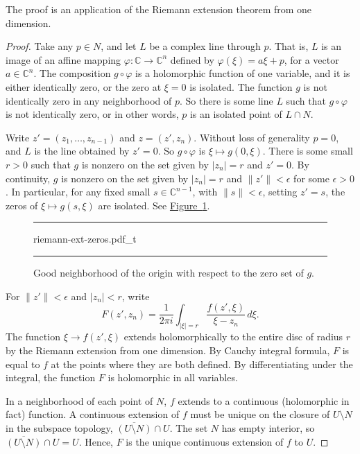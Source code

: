 \documentclass[12pt,openany]{book}
\newcommand{\sabs}[1]{\lvert {#1} \rvert}
\newcommand{\snorm}[1]{\lVert {#1} \rVert}
\newcommand{\abs}[1]{\left\lvert {#1} \right\rvert}
\newcommand{\C}{{\mathbb{C}}}
\theoremstyle{plain}
\theoremstyle{remark}
\theoremstyle{definition}
\newenvironment{myfig}{%
\begin{figure}[h!t]
\noindent\rule{\textwidth}{0.5pt}\vspace{12pt}\par\centering}%
{\par\noindent\rule{\textwidth}{0.5pt}
\end{figure}}
\theoremstyle{exercise}
\theoremstyle{example}
\newcommand{\figureref}[1]{\hyperref[#1]{Figure~\ref*{#1}}}
\begin{document}
The proof is an application of the Riemann extension theorem from one dimension.

\begin{proof}
Take any $p \in N$, and let $L$ be a complex line through $p$.
That is,
$L$ is an image of an affine mapping
$\varphi \colon \C \to \C^n$ defined by
$\varphi(\xi) = a\xi + p$, for a vector $a \in \C^n$.
The composition $g \circ \varphi$
is a holomorphic function of one variable, and it
is either identically zero, or
the zero at $\xi=0$ is isolated.
The function $g$ is not identically zero in any neighborhood of $p$.
So there is some line $L$ such that $g \circ \varphi$
is not identically zero, or in other words, $p$
is an isolated point of $L \cap N$.

Write $z' =
(z_1,\ldots,z_{n-1})$ and $z=(z',z_n)$.
Without loss of generality $p = 0$, and $L$ is the line
obtained by $z' = 0$.
So $g \circ \varphi$ is $\xi \mapsto g(0,\xi)$.
There is some small
$r > 0$ such that $g$ is nonzero on the set
given by $\sabs{z_n} = r$ and $z' = 0$.
By continuity,
$g$ is nonzero on the set given by
$\sabs{z_n} = r$ and $\snorm{z'} <\epsilon$ for some $\epsilon >0$.
In particular, for any fixed small $s \in \C^{n-1}$, with $\snorm{s} < \epsilon$,
setting $z' = s$,
the zeros of $\xi \mapsto g(s,\xi)$ are isolated.  See
\figureref{fig:riemann-ext-zeros}.

\begin{myfig}
{riemann-ext-zeros.pdf_t}
\caption{Good neighborhood of the origin with respect to
the zero set of $g$.\label{fig:riemann-ext-zeros}}
\end{myfig}

For $\snorm{z'} <
\epsilon$ and $\abs{z_n} < r$, write
\begin{equation*}
F(z',z_n) =
\frac{1}{2\pi i}
\int_{\sabs{\xi}=r} \frac{f(z',\xi)}{\xi-z_n} \,d\xi .
\end{equation*}
The function $\xi \to f(z',\xi)$ extends holomorphically to the entire
disc of radius $r$ by the Riemann extension from one dimension.  By Cauchy
integral formula,
$F$ is equal to $f$ at the points where they are both defined.
By differentiating under the integral, the function $F$ is holomorphic
in all variables.

In a neighborhood of each point of 
$N$, $f$ extends to a continuous (holomorphic in fact) function.
A continuous extension of $f$ must be unique
on the closure of
$U \setminus N$ in the subspace topology,
$\overline{(U \setminus N)} \cap U$.  The set $N$ has empty interior,
so $\overline{(U \setminus N)} \cap U = U$.  Hence, $F$ is the unique
continuous extension of $f$ to $U$.
\end{proof}
\end{document}
